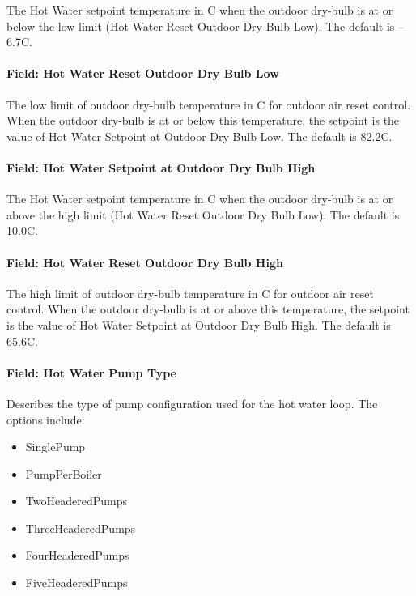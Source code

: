 The Hot Water setpoint temperature in C when the outdoor dry-bulb is at or below the low limit (Hot Water Reset Outdoor Dry Bulb Low). The default is --6.7C.

\paragraph{Field: Hot Water Reset Outdoor Dry Bulb Low}\label{field-hot-water-reset-outdoor-dry-bulb-low}

The low limit of outdoor dry-bulb temperature in C for outdoor air reset control. When the outdoor dry-bulb is at or below this temperature, the setpoint is the value of Hot Water Setpoint at Outdoor Dry Bulb Low. The default is 82.2C.

\paragraph{Field: Hot Water Setpoint at Outdoor Dry Bulb High}\label{field-hot-water-setpoint-at-outdoor-dry-bulb-high}

The Hot Water setpoint temperature in C when the outdoor dry-bulb is at or above the high limit (Hot Water Reset Outdoor Dry Bulb Low). The default is 10.0C.

\paragraph{Field: Hot Water Reset Outdoor Dry Bulb High}\label{field-hot-water-reset-outdoor-dry-bulb-high}

The high limit of outdoor dry-bulb temperature in C for outdoor air reset control. When the outdoor dry-bulb is at or above this temperature, the setpoint is the value of Hot Water Setpoint at Outdoor Dry Bulb High. The default is 65.6C.

\paragraph{Field: Hot Water Pump Type}\label{field-hot-water-pump-type}

Describes the type of pump configuration used for the hot water loop. The options include:

\begin{itemize}
\item
  SinglePump
\item
  PumpPerBoiler
\item
  TwoHeaderedPumps
\item
  ThreeHeaderedPumps
\item
  FourHeaderedPumps
\item
  FiveHeaderedPumps
\end{itemize}

